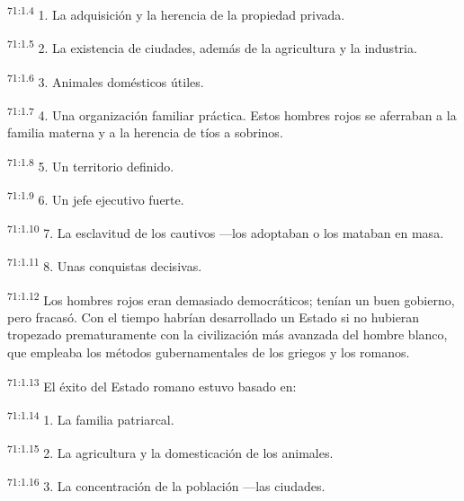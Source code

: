 \par
\textsuperscript{71:1.4} 1. La adquisición y la herencia de la propiedad privada.

\par
\textsuperscript{71:1.5} 2. La existencia de ciudades, además de la agricultura y la industria.

\par
\textsuperscript{71:1.6} 3. Animales domésticos útiles.

\par
\textsuperscript{71:1.7} 4. Una organización familiar práctica. Estos hombres rojos se aferraban a la familia materna y a la herencia de tíos a sobrinos.

\par
\textsuperscript{71:1.8} 5. Un territorio definido.

\par
\textsuperscript{71:1.9} 6. Un jefe ejecutivo fuerte.

\par
\textsuperscript{71:1.10} 7. La esclavitud de los cautivos ---los adoptaban o los mataban en masa.

\par
\textsuperscript{71:1.11} 8. Unas conquistas decisivas.

\par
\textsuperscript{71:1.12} Los hombres rojos eran demasiado democráticos; tenían un buen gobierno, pero fracasó. Con el tiempo habrían desarrollado un Estado si no hubieran tropezado prematuramente con la civilización más avanzada del hombre blanco, que empleaba los métodos gubernamentales de los griegos y los romanos.

\par
\textsuperscript{71:1.13} El éxito del Estado romano estuvo basado en:

\par
\textsuperscript{71:1.14} 1. La familia patriarcal.

\par
\textsuperscript{71:1.15} 2. La agricultura y la domesticación de los animales.

\par
\textsuperscript{71:1.16} 3. La concentración de la población ---las ciudades.

